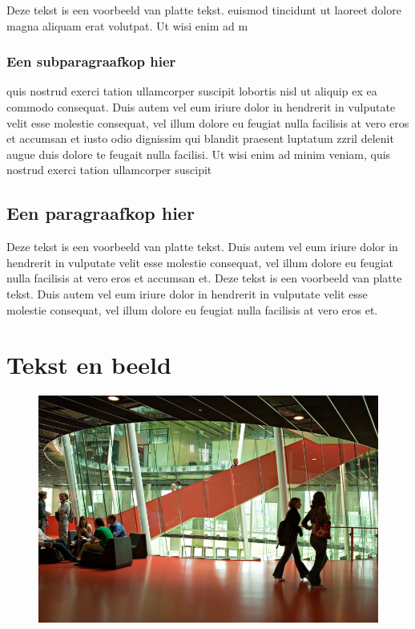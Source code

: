\documentclass[dutch]{uureport}
\begin{document}
Deze tekst is een voorbeeld van platte tekst. euismod tincidunt ut
laoreet dolore magna aliquam erat volutpat. Ut wisi enim ad m

\subsection{Een subparagraafkop hier}

  quis nostrud exerci tation ullamcorper suscipit lobortis nisl ut aliquip ex ea commodo consequat. Duis autem vel eum iriure dolor in hendrerit in vulputate velit esse molestie consequat, vel illum dolore eu feugiat nulla facilisis at vero eros et accumsan et iusto odio dignissim qui blandit praesent luptatum zzril delenit augue duis dolore te feugait nulla facilisi. Ut wisi enim ad minim veniam, quis nostrud exerci tation ullamcorper suscipit

\section{Een paragraafkop hier}

Deze tekst is een voorbeeld van platte tekst. Duis autem vel eum iriure dolor in hendrerit in vulputate velit esse molestie consequat, vel illum dolore eu feugiat nulla facilisis at vero eros et accumsan et. 
Deze tekst is een voorbeeld van platte tekst. Duis autem vel eum iriure dolor in hendrerit in vulputate velit esse molestie consequat, vel illum dolore eu feugiat nulla facilisis at vero eros et.

\chapter{Tekst en beeld}

\begin{figure}[h]
\includegraphics[width=\linewidth]{sample-image.png}
\end{figure}
\end{document}
